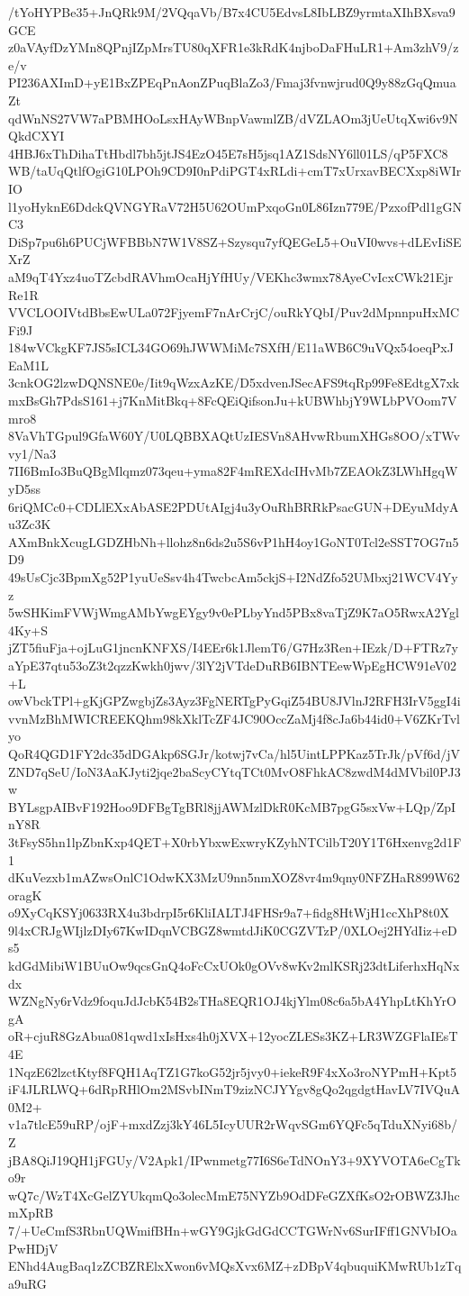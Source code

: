 /tYoHYPBe35+JnQRk9M/2VQqaVb/B7x4CU5EdvsL8IbLBZ9yrmtaXIhBXsva9GCE
z0aVAyfDzYMn8QPnjIZpMrsTU80qXFR1e3kRdK4njboDaFHuLR1+Am3zhV9/ze/v
PI236AXImD+yE1BxZPEqPnAonZPuqBlaZo3/Fmaj3fvnwjrud0Q9y88zGqQmuaZt
qdWnNS27VW7aPBMHOoLsxHAyWBnpVawmlZB/dVZLAOm3jUeUtqXwi6v9NQkdCXYI
4HBJ6xThDihaTtHbdl7bh5jtJS4EzO45E7sH5jsq1AZ1SdsNY6ll01LS/qP5FXC8
WB/taUqQtlfOgiG10LPOh9CD9I0nPdiPGT4xRLdi+cmT7xUrxavBECXxp8iWIrIO
l1yoHyknE6DdckQVNGYRaV72H5U62OUmPxqoGn0L86Izn779E/PzxofPdl1gGNC3
DiSp7pu6h6PUCjWFBBbN7W1V8SZ+Szysqu7yfQEGeL5+OuVI0wvs+dLEvIiSEXrZ
aM9qT4Yxz4uoTZcbdRAVhmOcaHjYfHUy/VEKhc3wmx78AyeCvIcxCWk21EjrRe1R
VVCLOOIVtdBbsEwULa072FjyemF7nArCrjC/ouRkYQbI/Puv2dMpnnpuHxMCFi9J
184wVCkgKF7JS5sICL34GO69hJWWMiMc7SXfH/E11aWB6C9uVQx54oeqPxJEaM1L
3cnkOG2lzwDQNSNE0e/Iit9qWzxAzKE/D5xdvenJSecAFS9tqRp99Fe8EdtgX7xk
mxBsGh7PdsS161+j7KnMitBkq+8FcQEiQifsonJu+kUBWhbjY9WLbPVOom7Vmro8
8VaVhTGpul9GfaW60Y/U0LQBBXAQtUzIESVn8AHvwRbumXHGs8OO/xTWvvy1/Na3
7II6BmIo3BuQBgMlqmz073qeu+yma82F4mREXdcIHvMb7ZEAOkZ3LWhHgqWyD5ss
6riQMCc0+CDLlEXxAbASE2PDUtAIgj4u3yOuRhBRRkPsacGUN+DEyuMdyAu3Zc3K
AXmBnkXcugLGDZHbNh+llohz8n6ds2u5S6vP1hH4oy1GoNT0Tcl2eSST7OG7n5D9
49sUsCjc3BpmXg52P1yuUeSsv4h4TwcbcAm5ckjS+I2NdZfo52UMbxj21WCV4Yyz
5wSHKimFVWjWmgAMbYwgEYgy9v0ePLbyYnd5PBx8vaTjZ9K7aO5RwxA2Ygl4Ky+S
jZT5fiuFja+ojLuG1jncnKNFXS/I4EEr6k1JlemT6/G7Hz3Ren+IEzk/D+FTRz7y
aYpE37qtu53oZ3t2qzzKwkh0jwv/3lY2jVTdeDuRB6IBNTEewWpEgHCW91eV02+L
owVbckTPl+gKjGPZwgbjZs3Ayz3FgNERTgPyGqiZ54BU8JVlnJ2RFH3IrV5ggI4i
vvnMzBhMWICREEKQhm98kXklTcZF4JC90OccZaMj4f8cJa6b44id0+V6ZKrTvlyo
QoR4QGD1FY2dc35dDGAkp6SGJr/kotwj7vCa/hl5UintLPPKaz5TrJk/pVf6d/jV
ZND7qSeU/IoN3AaKJyti2jqe2baScyCYtqTCt0MvO8FhkAC8zwdM4dMVbil0PJ3w
BYLsgpAIBvF192Hoo9DFBgTgBRl8jjAWMzlDkR0KcMB7pgG5sxVw+LQp/ZpInY8R
3tFsyS5hn1lpZbnKxp4QET+X0rbYbxwExwryKZyhNTCilbT20Y1T6Hxenvg2d1F1
dKuVezxb1mAZwsOnlC1OdwKX3MzU9nn5nmXOZ8vr4m9qny0NFZHaR899W62oragK
o9XyCqKSYj0633RX4u3bdrpI5r6KliIALTJ4FHSr9a7+fidg8HtWjH1ccXhP8t0X
9l4xCRJgWIjlzDIy67KwIDqnVCBGZ8wmtdJiK0CGZVTzP/0XLOej2HYdIiz+eDs5
kdGdMibiW1BUuOw9qcsGnQ4oFcCxUOk0gOVv8wKv2mlKSRj23dtLiferhxHqNxdx
WZNgNy6rVdz9foquJdJcbK54B2sTHa8EQR1OJ4kjYlm08c6a5bA4YhpLtKhYrOgA
oR+cjuR8GzAbua081qwd1xIsHxs4h0jXVX+12yocZLESs3KZ+LR3WZGFlaIEsT4E
1NqzE62lzctKtyf8FQH1AqTZ1G7koG52jr5jvy0+iekeR9F4xXo3roNYPmH+Kpt5
iF4JLRLWQ+6dRpRHlOm2MSvbINmT9zizNCJYYgv8gQo2qgdgtHavLV7IVQuA0M2+
v1a7tlcE59uRP/ojF+mxdZzj3kY46L5IcyUUR2rWqvSGm6YQFc5qTduXNyi68b/Z
jBA8QiJ19QH1jFGUy/V2Apk1/IPwnmetg77I6S6eTdNOnY3+9XYVOTA6eCgTko9r
wQ7c/WzT4XcGelZYUkqmQo3olecMmE75NYZb9OdDFeGZXfKsO2rOBWZ3JhcmXpRB
7/+UeCmfS3RbnUQWmifBHn+wGY9GjkGdGdCCTGWrNv6SurIFff1GNVbIOaPwHDjV
ENhd4AugBaq1zZCBZRElxXwon6vMQsXvx6MZ+zDBpV4qbuquiKMwRUb1zTqa9uRG

